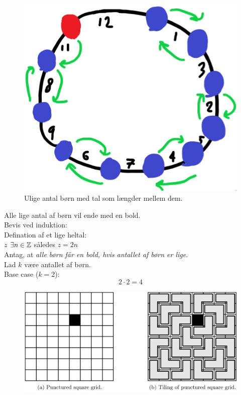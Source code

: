 \documentclass[a4paper,12pt]{article}
\begin{document}
\begin{figure}[H]
    \centering
    \includegraphics[scale=0.4]{odd.jpg}
    \caption{Ulige antal børn med tal som længder mellem dem.}
\end{figure}
\n
Alle lige antal af børn vil ende med en bold.\\
Bevis ved induktion:\\
Defination af et lige heltal:\\
$z$ $\exists n\in \mathbb{Z}$ således $z=2n$\\
Antag, at \textit{alle børn får en bold, hvis antallet af børn er lige}.\\
Lad $k$ være antallet af børn.\\
Base case ($k = 2$):
\[2 \cdot 2 = 4\]




\begin{figure}[H]
    \centering
    \includegraphics[scale=0.5]{figur.png}
    \caption*{}
\end{figure}
\end{document}
